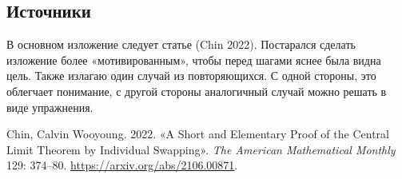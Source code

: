 \documentclass[
  letterpaper,
  DIV=11,
  numbers=noendperiod]{scrartcl}
\newlength{\cslhangindent}
\newenvironment{CSLReferences}[2] %
 {\begin{list}{}{%
  \setlength{\itemindent}{0pt}
  \setlength{\leftmargin}{0pt}
  \setlength{\parsep}{0pt}
  \ifodd #1
   \setlength{\leftmargin}{\cslhangindent}
   \setlength{\itemindent}{-1\cslhangindent}
  \fi
  \setlength{\itemsep}{#2\baselineskip}}}
 {\end{list}}
\begin{document}
\subsection{Источники}\label{ux438ux441ux442ux43eux447ux43dux438ux43aux438}

В основном изложение следует статье (Chin 2022). Постарался сделать
изложение более «мотивированным», чтобы перед шагами яснее была видна
цель. Также излагаю один случай из повторяющихся. С одной стороны, это
облегчает понимание, с другой стороны аналогичный случай можно решать в
виде упражнения.

\label{refs}
\begin{CSLReferences}{1}{0}
Chin, Calvin Wooyoung. 2022. {«A Short and Elementary Proof of the
Central Limit Theorem by Individual Swapping»}. \emph{The American
Mathematical Monthly} 129: 374--80.
\url{https://arxiv.org/abs/2106.00871}.

\end{CSLReferences}
\end{document}
